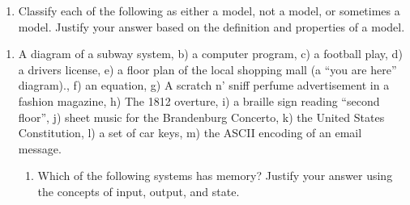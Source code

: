 \begin{enumerate}
\def\labelenumi{\arabic{enumi}.}
\item
  Classify each of the following as either a model, not a model, or
  sometimes a model. Justify your answer based on the definition and
  properties of a model.
\end{enumerate}

\begin{enumerate}
\def\labelenumi{\alph{enumi})}
\item
  A diagram of a subway system, b) a computer program, c) a football
  play, d) a drivers license, e) a floor plan of the local shopping mall
  (a ``you are here'' diagram)., f) an equation, g) A scratch n' sniff
  perfume advertisement in a fashion magazine, h) The 1812 overture, i)
  a braille sign reading ``second floor'', j) sheet music for the
  Brandenburg Concerto, k) the United States Constitution, l) a set of
  car keys, m) the ASCII encoding of an email message.

  \begin{enumerate}
  \def\labelenumii{\arabic{enumii}.}
  \item
    Which of the following systems has memory? Justify your answer using
    the concepts of input, output, and state.
  \end{enumerate}
\end{enumerate}

